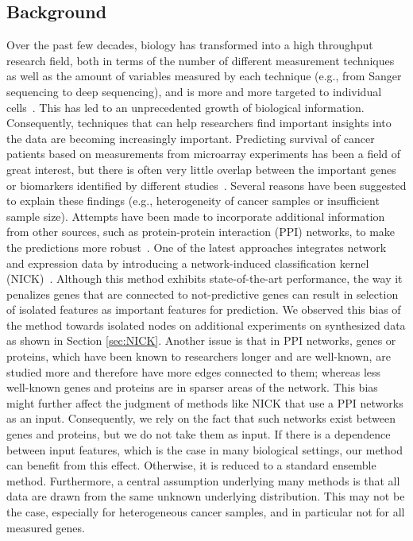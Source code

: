 \subsection{Background}
Over the past few decades, biology has transformed into a high throughput research field, both in terms of the number of different measurement techniques as well as the amount of variables measured by each technique (e.g., from Sanger sequencing to deep sequencing), and is more and more targeted to individual cells~\cite{Shapiro2013}. This has led to an unprecedented growth of biological information. Consequently, techniques that can help researchers find important insights into the data are becoming increasingly important.
Predicting survival of cancer patients based on measurements from
microarray experiments has been a field of great interest, but there
is often very little overlap between the important genes or biomarkers
identified by different studies~\cite{Ein-Dor2005}. Several reasons
have been suggested to explain these findings (e.g., heterogeneity of
cancer samples or insufficient sample size). Attempts have been made
to incorporate additional information from other sources, such as
protein-protein interaction (PPI) networks, to make the predictions
more robust~\cite{Chuang2007}. One of the latest approaches integrates
network and expression data by introducing a network-induced
classification kernel (NICK)~\cite{Lavi2012}. Although this method
exhibits state-of-the-art performance, the way it penalizes genes that
are connected to not-predictive genes can result in selection of
isolated features as important features for prediction. We observed
this bias of the method towards isolated nodes on additional
experiments on synthesized data as shown in Section \ref{sec:NICK}. Another issue is that in PPI networks, genes or proteins, which
have been known to researchers longer and are well-known, are studied
more and therefore have more edges connected to them; whereas less
well-known genes and proteins are in sparser areas of the
network. This bias might further affect the judgment of methods like
NICK that use a PPI networks as an input. Consequently, we rely on the
fact that such networks exist between genes and proteins, but we do
not take them as input. If
there is a dependence between input features, which is the case in
many biological settings, our method can benefit from this
effect. Otherwise, it is reduced to a standard ensemble method.
Furthermore, a central assumption underlying many methods is that all data are drawn from the same unknown underlying distribution. This may not be the case, especially for heterogeneous cancer samples, and in particular not for all measured genes.

